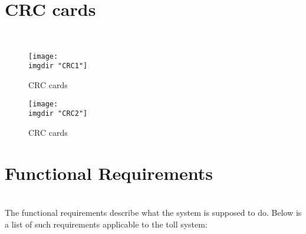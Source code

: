 \section{CRC cards} \anna \piotr \\
\begin{figure}[H]
\texttt{[image: \\imgdir "CRC1"]}
\centering
\caption{CRC cards}
\label{fig:crc_1}
\end{figure}

\begin{figure}[H]
\texttt{[image: \\imgdir "CRC2"]}
\centering
\caption{CRC cards}
\label{fig:crc_2}
\end{figure}

\section{Functional Requirements} \pawel \\
The functional requirements describe what the system is supposed to do. Below is a list of such requirements applicable to the toll system:
